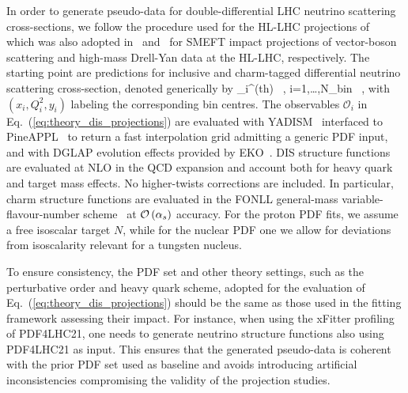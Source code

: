  In order to generate pseudo-data for double-differential
 LHC neutrino scattering cross-sections, we follow the procedure
 used for the HL-LHC projections of~\cite{AbdulKhalek:2018rok} which was
 also adopted in~\cite{Ethier:2021ydt} and~\cite{Greljo:2021kvv} for SMEFT impact projections
 of vector-boson scattering and high-mass Drell-Yan data at the HL-LHC, respectively.
 The starting point are predictions for inclusive and charm-tagged
 differential neutrino scattering cross-section, denoted generically by
 \be
 \label{eq:theory_dis_projections}
 _i^{{\rm (th)}} \equiv {} \, ,\quad
 i=1,\ldots,N_{\rm bin} \, ,
 \ee
 with $(x_i,Q^2_i,y_i)$ labeling the corresponding bin centres.
 The observables $\mathcal{O}_i $ in Eq.~(\ref{eq:theory_dis_projections})
are evaluated with 
{\sc\small YADISM}~\cite{yadism,Candido:2023utz}
interfaced to {\sc\small PineAPPL}~\cite{Carrazza:2020gss, christopher_schwan_2023_7995675}
to return a fast interpolation grid admitting a generic PDF input,
and with DGLAP evolution effects provided by {\sc\small EKO}~\cite{Candido:2022tld}.
%
DIS structure functions are evaluated at NLO in the QCD expansion
and account both for heavy quark and target mass effects.
%
No higher-twists corrections are included.
%
In particular,
charm structure functions are evaluated in the FONLL general-mass variable-flavour-number
scheme~\cite{Forte:2010ta,Ball:2011mu,Faura:2020oom} at $\mathcal{O}\left( \alpha_s\right)$
accuracy.
%
For the proton PDF fits, we assume a free isoscalar target $N$, while
for the nuclear PDF one we allow for deviations from isoscalarity relevant
for a tungsten nucleus.

To ensure consistency, the PDF set and other theory settings, such as the perturbative
order and heavy quark scheme, adopted for the evaluation of
Eq.~(\ref{eq:theory_dis_projections}) should be the same as those
used in the fitting framework assessing their impact.
%
For instance, when using the {\sc\small xFitter} profiling of PDF4LHC21, one needs
 to generate  neutrino structure functions also using PDF4LHC21 as input.
This ensures that the generated pseudo-data is coherent with the prior PDF
 set used as baseline and avoids introducing artificial inconsistencies 
 compromising the validity of the projection studies.
 
